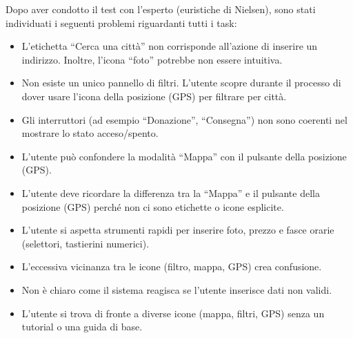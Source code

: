 \documentclass{article}
\begin{document}
Dopo aver condotto il test con l'esperto (euristiche di Nielsen), sono stati individuati i seguenti problemi riguardanti tutti i task:
\begin{itemize}
    \item L’etichetta “Cerca una città” non corrisponde all'azione di inserire un indirizzo. Inoltre, l’icona “foto” potrebbe non essere intuitiva.
    \item Non esiste un unico pannello di filtri. L’utente scopre durante il processo di dover usare l’icona della posizione (GPS) per filtrare per città.
    \item Gli interruttori (ad esempio “Donazione”, “Consegna”) non sono coerenti nel mostrare lo stato acceso/spento.
    \item L’utente può confondere la modalità “Mappa” con il pulsante della posizione (GPS).
    \item L’utente deve ricordare la differenza tra la “Mappa” e il pulsante della posizione (GPS) perché non ci sono etichette o icone esplicite.
    \item L’utente si aspetta strumenti rapidi per inserire foto, prezzo e fasce orarie (selettori, tastierini numerici).
    \item L’eccessiva vicinanza tra le icone (filtro, mappa, GPS) crea confusione.
    \item Non è chiaro come il sistema reagisca se l’utente inserisce dati non validi.
    \item L’utente si trova di fronte a diverse icone (mappa, filtri, GPS) senza un tutorial o una guida di base.
\end{itemize} 
\end{document}
